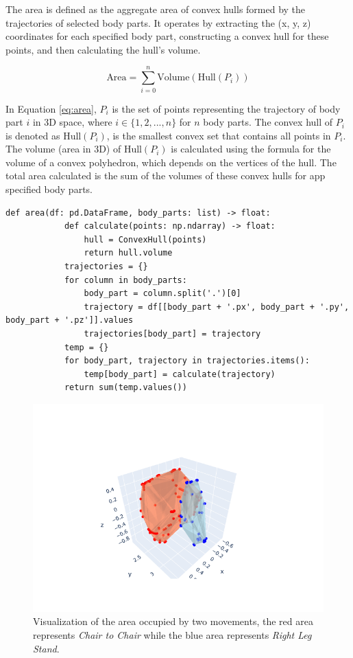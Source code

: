                 The area is defined as the aggregate area of convex hulls formed by the trajectories of selected body parts. It operates by extracting the (x, y, z) coordinates for each specified body part, constructing a convex hull for these points, and then calculating the hull's volume.

                \begin{equation}\label{eq:area}
                    \text{Area} = \sum_{i=0}^{n} \text{Volume}(\text{Hull}(P_i))
                \end{equation}
            
                In Equation \ref{eq:area}, $P_i$ is the set of points representing the trajectory of body part $i$ in 3D space, where $i \in \{1, 2, ..., n\}$ for $n$ body parts. The convex hull of $P_i$ is denoted as $\text{Hull}(P_i)$, is the smallest convex set that contains all points in $P_i$. The volume (area in 3D) of $\text{Hull}(P_i)$ is calculated using the formula for the volume of a convex polyhedron, which depends on the vertices of the hull. The total area calculated is the sum of the volumes of these convex hulls for app specified body parts.
                
        \begin{lstlisting}[caption={Area calculation method using the ConvexHull class from the SciPy library.}] 
        def area(df: pd.DataFrame, body_parts: list) -> float:
            def calculate(points: np.ndarray) -> float:
                hull = ConvexHull(points)
                return hull.volume
            trajectories = {}
            for column in body_parts:
                body_part = column.split('.')[0]
                trajectory = df[[body_part + '.px', body_part + '.py', body_part + '.pz']].values
                trajectories[body_part] = trajectory
            temp = {}
            for body_part, trajectory in trajectories.items():
                temp[body_part] = calculate(trajectory)
            return sum(temp.values())
        \end{lstlisting}

                \begin{figure}[H]
                    \centering
                    \includegraphics[width=.6\textwidth]{../src/resources/plots/feat-eng/area_difference.png}
                    \caption{
                        Visualization of the area occupied by two movements, the red area represents \textit{Chair to Chair} while the blue area represents \textit{Right Leg Stand}. 
                    }
                    \label{fig:area}
                \end{figure}
            
